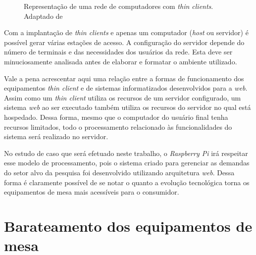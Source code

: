 \begin{figure}[ht]
    \centering
    \caption{Representação de uma rede de computadores com \textit{thin clients}. Adaptado de \cite{THINCLIENT}}
\end{figure}

Com a implantação de \textit{thin clients} e apenas um computador (\textit{host} ou servidor) é possível gerar várias estações de acesso. A configuração do servidor depende do número de terminais e das necessidades dos usuários da rede. Esta deve ser minuciosamente analisada antes de elaborar e formatar o ambiente utilizado.

Vale a pena acrescentar aqui uma relação entre a formas de funcionamento dos equipamentos \textit{thin client} e de sistemas informatizados desenvolvidos para a \textit{web}. Assim como um \textit{thin client} utiliza os recursos de um servidor configurado, um sistema \textit{web} ao ser executado também utiliza os recursos do servidor no qual está hospedado. Dessa forma, mesmo que o computador do usuário final tenha recursos limitados, todo o processamento relacionado às funcionalidades do sistema será realizado no servidor.

No estudo de caso que será efetuado neste trabalho, o \textit{Raspberry Pi} irá respeitar esse modelo de processamento, pois o sistema criado para gerenciar as demandas do setor alvo da pesquisa foi desenvolvido utilizando arquitetura \textit{web}. Dessa forma é claramente possível de se notar o quanto a evolução tecnológica torna os equipamentos de mesa mais acessíveis para o consumidor.

\section{Barateamento dos equipamentos de mesa}

